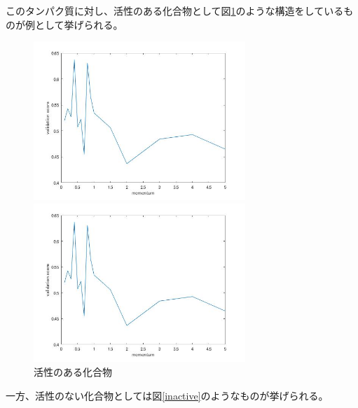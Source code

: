 \documentclass[a4j,11pt]{jarticle}
\begin{document}
このタンパク質に対し、活性のある化合物として図\ref{active}のような構造をしているものが例として挙げられる。

\begin{figure}[H]
	\begin{minipage}{0.33\hsize}
		\begin{center}
			\includegraphics[width=8cm, bb=0 0 560 420]{../matlab/test.jpg}
		\end{center}
	\end{minipage}
	\begin{minipage}{0.33\hsize}
		\begin{center}
		\end{center}
	\end{minipage}
	\begin{minipage}{0.33\hsize}
		\begin{center}
			\includegraphics[width=8cm, bb=0 0 560 420]{../matlab/test.jpg}
		\end{center}
	\end{minipage}
	\caption{活性のある化合物} \label{active}
\end{figure}

一方、活性のない化合物としては図\ref{inactive}のようなものが挙げられる。
\end{document}
